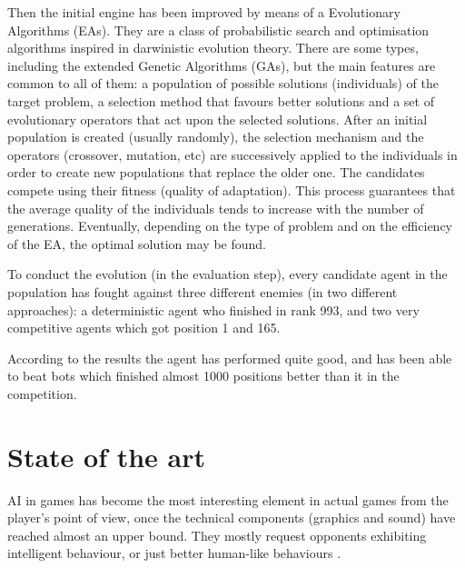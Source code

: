 \documentclass[runningheads]{llncs}
\begin{document}
Then the initial engine has been improved by means of a Evolutionary Algorithms (EAs)\cite{INTROEIBEN}. They are a class of probabilistic search and optimisation algorithms inspired in darwinistic evolution theory. 
There are some types, including the extended Genetic Algorithms (GAs)\cite{GA_Goldberg89}, but the main features are common to all of them: a population of possible solutions (individuals) of the target problem, a selection method that favours better solutions and a set of evolutionary operators that act upon the selected solutions.
After an initial population is created (usually randomly), the selection mechanism and the operators (crossover, mutation, etc) are successively applied to the individuals in order to create new populations that replace the older one. The candidates compete using their fitness (quality of adaptation). This process guarantees that the average quality of the individuals tends to increase with the number of generations. Eventually, depending on the type of problem and on the efficiency of the EA, the optimal solution may be found.


To conduct the evolution (in the evaluation step), every candidate agent in the population has fought against three different enemies (in two different approaches): a deterministic agent who finished in rank 993,
and two very competitive agents which got position 1 and 165.

According to the results the agent has performed quite good, and has been able to beat bots which finished almost 1000 positions better than it in the competition.





\section{State of the art}
\label{sec:soa}



AI in games has become the most interesting element in actual games from the player's point of view, once the technical components (graphics and sound) have reached almost an upper bound. They mostly request opponents exhibiting intelligent behaviour, or just better human-like behaviours \cite{artifical-stupidity-game-wisdom2-2004}.
\end{document}
